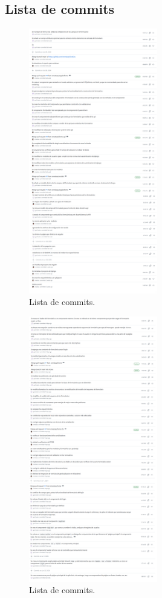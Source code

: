 \documentclass{article}
\begin{document}
\subsection{Lista de commits}
\begin{figure}[H]
	\centering
	\includegraphics[width=0.5\textwidth,keepaspectratio]{img/commits1.png}
	\caption{Lista de commits.}
\end{figure}
\pagebreak
\begin{figure}[H]
	\centering
	\includegraphics[width=0.5\textwidth,keepaspectratio]{img/commits2.png}
	\caption{Lista de commits.}
\end{figure}
\end{document}
